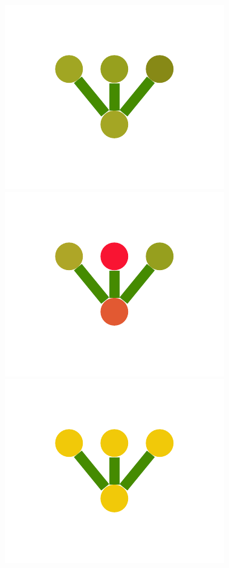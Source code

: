 \documentclass[a4paper,10pt]{article}
\begin{document}
\begin{figure}
{    \includegraphics[scale=.2]{./figures/6-2-multiple-color-flower-induced-0.pdf}
    \includegraphics[scale=.2]{./figures/6-2-multiple-color-flower-induced-1.pdf}
    \includegraphics[scale=.2]{./figures/6-2-multiple-color-flower-induced-2.pdf}
}
\end{figure}
\end{document}
